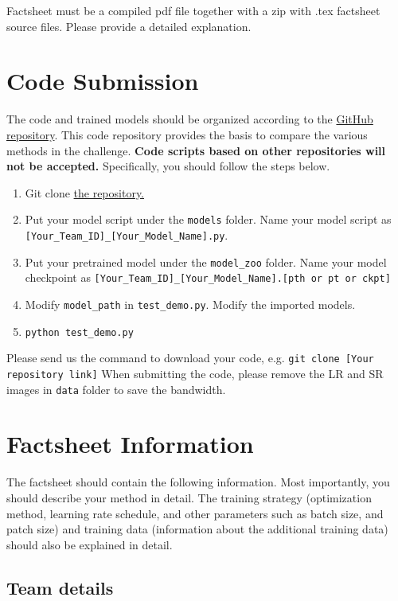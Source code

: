 \documentclass[10pt,twocolumn,letterpaper]{article}
\begin{document}
\noindent Factsheet must be a compiled pdf file together with a zip with .tex factsheet source files. Please provide a detailed explanation.


\section{Code Submission}

The code and trained models should be organized according to the \href{https://github.com/Amazingren/NTIRE2025_ESR}{GitHub repository}. This code repository provides the basis to compare the various methods in the challenge. \textbf{Code scripts based on other repositories will not be accepted.} Specifically, you should follow the steps below.
\begin{enumerate}
    \item Git clone \href{https://github.com/Amazingren/NTIRE2025_ESR}{the repository.}
    \item Put your model script under the \texttt{models} folder. Name your model script as \texttt{[Your\_Team\_ID]\_[Your\_Model\_Name].py}.
    \item Put your pretrained model under the \texttt{model\_zoo} folder. Name your model checkpoint as \texttt{[Your\_Team\_ID]\_[Your\_Model\_Name].[pth or pt or ckpt]}
    \item Modify \texttt{model\_path} in \texttt{test\_demo.py}. Modify the imported models.
    \item \texttt{python test\_demo.py}
\end{enumerate}
Please send us the command to download your code, e.g. \texttt{git clone [Your repository link]}
When submitting the code, please remove the LR and SR images in \texttt{data} folder to save the bandwidth.

\section{Factsheet Information}

The factsheet should contain the following information. Most importantly, you should describe your method in detail. The training strategy (optimization method, learning rate schedule, and other parameters such as batch size, and patch size) and training data (information about the additional training data) should also be explained in detail.

\subsection{Team details}
\end{document}
